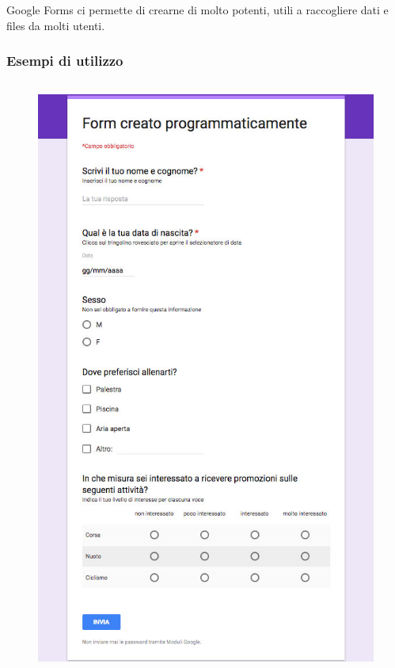 \documentclass[]{beamer}
\begin{document}
\begin{frame}
~


~

\alert{Google Forms} ci permette di crearne di molto potenti, utili a raccogliere dati e files da molti utenti.
\end{frame}


\begin{frame}
\frametitle{Esempi di utilizzo}
\begin{columns}
  \begin{column}{.4\textwidth}
    \begin{figure}
      \includegraphics[width=\columnwidth]{img/form1.jpg}

\end{figure}
\end{column}
\end{columns}
\end{frame}
\end{document}
